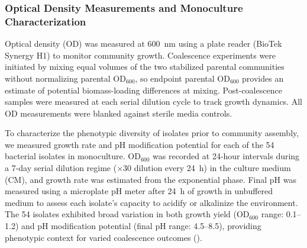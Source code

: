 

\subsubsection*{Optical Density Measurements and Monoculture Characterization}
\label{sec:suppl:od}

Optical density (OD) was measured at 600~nm using a plate reader (BioTek Synergy H1) to monitor community growth. Coalescence experiments were initiated by mixing equal volumes of the two stabilized parental communities without normalizing parental OD$_{600}$, so endpoint parental OD$_{600}$ provides an estimate of potential biomass-loading differences at mixing. Post-coalescence samples were measured at each serial dilution cycle to track growth dynamics. All OD measurements were blanked against sterile media controls.

To characterize the phenotypic diversity of isolates prior to community assembly, we measured growth rate and pH modification potential for each of the 54 bacterial isolates in monoculture. OD$_{600}$ was recorded at 24-hour intervals during a 7-day serial dilution regime ($\times$30 dilution every 24~h) in the culture medium (CM), and growth rate was estimated from the exponential phase. Final pH was measured using a microplate pH meter after 24~h of growth in unbuffered medium to assess each isolate's capacity to acidify or alkalinize the environment.  The 54 isolates exhibited broad variation in both growth yield (OD$_{600}$ range: 0.1--1.2) and pH modification potential (final pH range: 4.5--8.5), providing phenotypic context for varied coalescence outcomes ().
